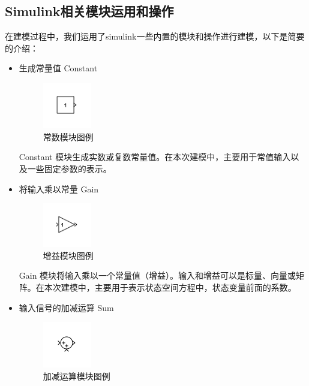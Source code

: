 \clearpage

\subsection{Simulink相关模块运用和操作}

在建模过程中，我们运用了simulink一些内置的模块和操作进行建模，以下是简要的介绍：

\begin{itemize}
	
	\item 生成常量值 Constant
	
	\begin{figure}[H]
		\centering
		\includegraphics[width=0.2\textwidth]{fig/simulink/constant_block.png}
		\caption{常数模块图例}\label{fig:constant_block}
	\end{figure}
	
	Constant 模块生成实数或复数常量值。在本次建模中，主要用于常值输入以及一些固定参数的表示。
	
	\item 将输入乘以常量 Gain
	
	\begin{figure}[H]
		\centering
		\includegraphics[width=0.2\textwidth]{fig/simulink/gain_block.png}
		\caption{增益模块图例}\label{fig:gain_block}
	\end{figure}
	
	Gain 模块将输入乘以一个常量值（增益）。输入和增益可以是标量、向量或矩阵。在本次建模中，主要用于表示状态空间方程中，状态变量前面的系数。
	
	\item 输入信号的加减运算 Sum
	
	\begin{figure}[H]
		\centering
		\includegraphics[width=0.2\textwidth]{fig/simulink/sum_block.png}
		\caption{加减运算模块图例}\label{fig:sum_block}
	\end{figure}
	

\end{itemize}
